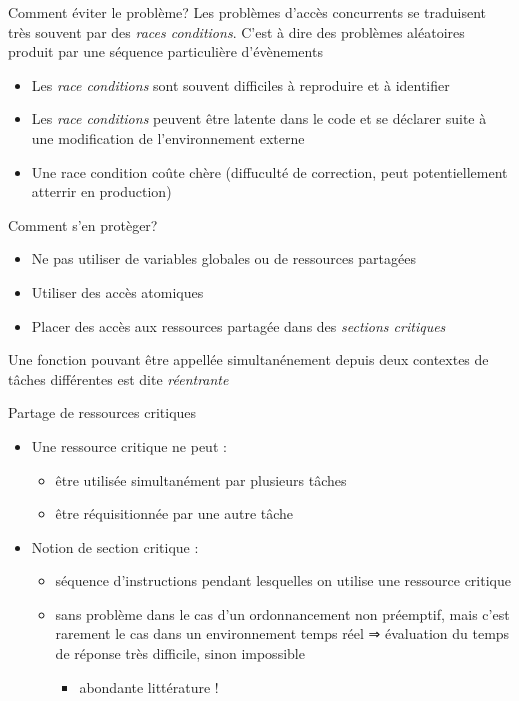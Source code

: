 \begin{frame}{Comment éviter le problème?}
  Les problèmes  d'accès concurrents se  traduisent très souvent  par des
  \emph{races  conditions}.  C'est  à  dire des  problèmes  aléatoires
  produit par une séquence particulière d'évènements
  \begin{itemize} 
  \item   Les  \emph{race  conditions}   sont  souvent   difficiles  à
    reproduire et à identifier
  \item Les  \emph{race conditions} peuvent être latente  dans le code
    et se déclarer suite à une modification de l'environnement externe
  \item Une race condition coûte chère (diffuculté de correction, peut
    potentiellement atterrir en production)
  \end{itemize} 
  Comment s'en protèger?
  \begin{itemize} 
  \item Ne pas utiliser de variables globales ou de ressources partagées
  \item Utiliser des accès atomiques
  \item  Placer des  accès aux  ressources partagée  dans  des \emph{sections
    critiques}
  \end{itemize} 
  Une  fonction  pouvant  être  appellée simultanénement  depuis  deux
  contextes de tâches différentes est dite \emph{réentrante}
\end{frame} 

\begin{frame}{Partage de ressources critiques} 
  \begin{itemize}
  \item Une ressource critique ne peut :
    \begin{itemize}
    \item être utilisée simultanément par plusieurs tâches 
    \item être réquisitionnée par une autre tâche 
    \end{itemize}
  \item Notion de section critique :
    \begin{itemize}
    \item  séquence d'instructions pendant  lesquelles on  utilise une
      ressource critique
    \item sans problème dans le cas d'un ordonnancement non préemptif,
      mais c'est  rarement le cas  dans un environnement temps  réel ⇒
      évaluation du temps de réponse très difficile, sinon impossible
      \begin{itemize}
      \item abondante littérature ! 
      \end{itemize}
    \end{itemize}
  \end{itemize}
\end{frame}

